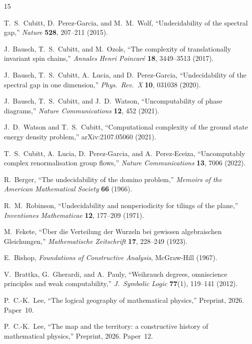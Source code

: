 \documentclass[11pt,a4paper]{article}
\theoremstyle{plain}
\theoremstyle{definition}
\begin{document}
\begin{thebibliography}{15}

T.~S.~Cubitt, D.~Perez-Garcia, and M.~M.~Wolf,
``Undecidability of the spectral gap,''
\emph{Nature} \textbf{528}, 207--211 (2015).

J.~Bausch, T.~S.~Cubitt, and M.~Ozols,
``The complexity of translationally invariant spin chains,''
\emph{Annales Henri Poincar\'e} \textbf{18}, 3449--3513 (2017).

J.~Bausch, T.~S.~Cubitt, A.~Lucia, and D.~Perez-Garcia,
``Undecidability of the spectral gap in one dimension,''
\emph{Phys.\ Rev.\ X} \textbf{10}, 031038 (2020).

J.~Bausch, T.~S.~Cubitt, and J.~D.~Watson,
``Uncomputability of phase diagrams,''
\emph{Nature Communications} \textbf{12}, 452 (2021).

J.~D.~Watson and T.~S.~Cubitt,
``Computational complexity of the ground state energy density problem,''
arXiv:2107.05060 (2021).

T.~S.~Cubitt, A.~Lucia, D.~Perez-Garcia, and A.~Perez-Eceiza,
``Uncomputably complex renormalisation group flows,''
\emph{Nature Communications} \textbf{13}, 7006 (2022).

R.~Berger,
``The undecidability of the domino problem,''
\emph{Memoirs of the American Mathematical Society} \textbf{66} (1966).

R.~M.~Robinson,
``Undecidability and nonperiodicity for tilings of the plane,''
\emph{Inventiones Mathematicae} \textbf{12}, 177--209 (1971).

M.~Fekete,
``{\"U}ber die Verteilung der Wurzeln bei gewissen algebraischen Gleichungen,''
\emph{Mathematische Zeitschrift} \textbf{17}, 228--249 (1923).

E.~Bishop,
\emph{Foundations of Constructive Analysis},
McGraw-Hill (1967).

V.~Brattka, G.~Gherardi, and A.~Pauly,
``Weihrauch degrees, omniscience principles and weak computability,''
\emph{J.\ Symbolic Logic} \textbf{77}(1), 119--141 (2012).

P.~C.-K.~Lee,
``The logical geography of mathematical physics,''
Preprint, 2026. Paper~10.

P.~C.-K.~Lee,
``The map and the territory: a constructive history of
  mathematical physics,''
Preprint, 2026. Paper~12.


\end{thebibliography}
\end{document}
